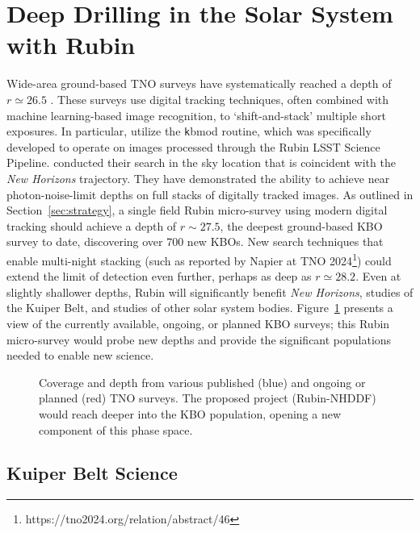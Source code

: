 \documentclass[modern,preprint]{aastex7}
\begin{document}
\section{Deep Drilling in the Solar System with Rubin}

Wide-area ground-based TNO surveys have systematically reached a depth of $r\simeq26.5$ \citep[see][for recent examples]{Fraser2024PSJ, Yoshida2024, Napier2023}.
These surveys use digital tracking techniques, often combined with machine learning-based image recognition, to `shift-and-stack' multiple short exposures.
In particular, \citet{Fraser2024PSJ} utilize the {\texttt kbmod} \citep{Smotherman2021} routine, which was specifically developed to operate on images processed through the Rubin LSST Science Pipeline.
\citet{Fraser2024PSJ} conducted their search in the sky location that is coincident with the {\it New Horizons} trajectory.
They have demonstrated the ability to achieve near photon-noise-limit depths on full stacks of digitally tracked images.
As outlined in Section~\ref{sec:strategy}, a single field Rubin micro-survey using modern digital tracking should achieve a depth of $r \sim 27.5$, the deepest ground-based KBO survey to date, discovering over 700 new KBOs. 
New search techniques that enable multi-night stacking (such as reported by Napier at TNO 2024\footnote{https://tno2024.org/relation/abstract/46}) could extend the limit of detection even further, perhaps as deep as $r\simeq28.2$.
Even at slightly shallower depths, Rubin will significantly benefit {\it New Horizons}, studies of the Kuiper Belt, and studies of other solar system bodies. 
Figure~\ref{fig-surveys} presents a view of the currently available, ongoing, or planned KBO surveys; this Rubin micro-survey would probe new depths and provide the significant populations needed to enable new science.

\begin{figure}
\caption{\label{fig-surveys}
Coverage and depth from various published (blue) and ongoing or planned (red) TNO surveys.  The proposed project (Rubin-NHDDF) would reach deeper into the KBO population, opening a new component of this phase space.
}
\end{figure}


\subsection{Kuiper Belt Science}
\end{document}
